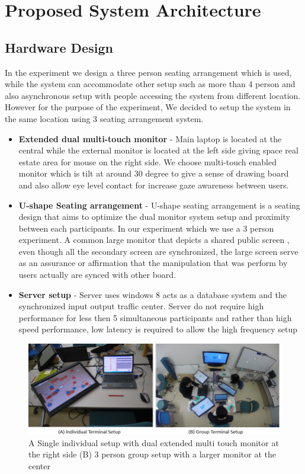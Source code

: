 \documentclass{sigchi}
\begin{document}
\section{Proposed System Architecture}


\subsection{Hardware Design}


In the experiment we design a three person seating arrangement which is used, while the system can accommodate other setup such as more than 4 person and also asynchronous setup with people accessing the system from different location. However for the purpose of the experiment, We decided to setup the system in the same location using 3 seating arrangement system. 

\begin{itemize}

\item \textbf{Extended dual multi-touch monitor} - Main laptop is located at the central while the external monitor is located at the left side giving space real estate area for mouse on the right side. We choose multi-touch enabled monitor which is tilt at around 30 degree to give a sense of drawing board and also allow eye level contact for increase gaze awareness between users. 
\item \textbf{U-shape Seating arrangement} - U-shape seating arrangement is a seating design that aims to optimize the dual monitor system setup and proximity between each participants. In our experiment which we use a 3 person experiment. A common large monitor that depicts a shared  public screen , even though all the secondary screen are synchronized, the large screen serve as an assurance or affirmation that the manipulation that was perform by users actually are synced with other board. 
\item \textbf{Server setup} - Server uses windows 8 acts as a database system and the synchronized input output traffic center. Server do not require high performance for less then 5 simultaneous participants and rather than high speed performance, low latency is required to allow the high frequency setup
\end{itemize}


\begin{figure}
\centering
\includegraphics[width=1.9\columnwidth]{system}
\caption{{A} Single individual setup with dual extended multi touch monitor at the right side (B) 3 person group setup with a larger monitor at the center}
\label{fig:figure1}
\end{figure}
\end{document}
